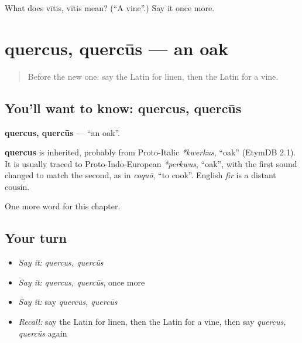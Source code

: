 \begin{tcolorbox}[breakable,colback=teal!4,colframe=teal!35!black,title={Before you move on}]
What does vītis, vītis mean? (\textquotedblleft{}A vine\textquotedblright{}.) Say it once more.
\end{tcolorbox}
\section[quercus, quercūs]{quercus, quercūs — an oak}

\label{lesson:LA-C250-quercus}



\begin{quote}
Before the new one: say the Latin for linen, then the Latin for a vine.
\end{quote}

\subsection*{You'll want to know: quercus, quercūs}
\textbf{quercus, quercūs} — \textquotedblleft{}an oak\textquotedblright{}.

\begin{cousinweb}
\textbf{quercus} is inherited, probably from Proto-Italic \emph{*kwerkus}, \textquotedblleft{}oak\textquotedblright{} (EtymDB 2.1). It is usually traced to Proto-Indo-European \emph{*perkwus}, \textquotedblleft{}oak\textquotedblright{}, with the first sound changed to match the second, as in \emph{coquō}, \textquotedblleft{}to cook\textquotedblright{}. English \emph{fir} is a distant cousin.
\end{cousinweb}

\begin{grammarlens}[title={What you've built}]
One more word for this chapter.
\end{grammarlens}

\subsection*{Your turn}
\begin{itemize}
\raggedright
  \item \emph{Say it:} \emph{quercus, quercūs}
  \item \emph{Say it:} \emph{quercus, quercūs}, once more
  \item \emph{Say it:} say \emph{quercus, quercūs}
  \item \emph{Recall:} say the Latin for linen, then the Latin for a vine, then say \emph{quercus, quercūs} again
\end{itemize}

